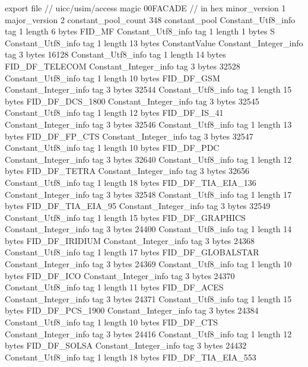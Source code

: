 export file {		// uicc/usim/access
	magic	00FACADE		 // in hex
	minor_version	1
	major_version	2
	constant_pool_count	348
	constant_pool {
		Constant_Utf8_info {
			tag	1
			length	6
			bytes	FID_MF
		}
		Constant_Utf8_info {
			tag	1
			length	1
			bytes	S
		}
		Constant_Utf8_info {
			tag	1
			length	13
			bytes	ConstantValue
		}
		Constant_Integer_info {
			tag	3
			bytes	16128
		}
		Constant_Utf8_info {
			tag	1
			length	14
			bytes	FID_DF_TELECOM
		}
		Constant_Integer_info {
			tag	3
			bytes	32528
		}
		Constant_Utf8_info {
			tag	1
			length	10
			bytes	FID_DF_GSM
		}
		Constant_Integer_info {
			tag	3
			bytes	32544
		}
		Constant_Utf8_info {
			tag	1
			length	15
			bytes	FID_DF_DCS_1800
		}
		Constant_Integer_info {
			tag	3
			bytes	32545
		}
		Constant_Utf8_info {
			tag	1
			length	12
			bytes	FID_DF_IS_41
		}
		Constant_Integer_info {
			tag	3
			bytes	32546
		}
		Constant_Utf8_info {
			tag	1
			length	13
			bytes	FID_DF_FP_CTS
		}
		Constant_Integer_info {
			tag	3
			bytes	32547
		}
		Constant_Utf8_info {
			tag	1
			length	10
			bytes	FID_DF_PDC
		}
		Constant_Integer_info {
			tag	3
			bytes	32640
		}
		Constant_Utf8_info {
			tag	1
			length	12
			bytes	FID_DF_TETRA
		}
		Constant_Integer_info {
			tag	3
			bytes	32656
		}
		Constant_Utf8_info {
			tag	1
			length	18
			bytes	FID_DF_TIA_EIA_136
		}
		Constant_Integer_info {
			tag	3
			bytes	32548
		}
		Constant_Utf8_info {
			tag	1
			length	17
			bytes	FID_DF_TIA_EIA_95
		}
		Constant_Integer_info {
			tag	3
			bytes	32549
		}
		Constant_Utf8_info {
			tag	1
			length	15
			bytes	FID_DF_GRAPHICS
		}
		Constant_Integer_info {
			tag	3
			bytes	24400
		}
		Constant_Utf8_info {
			tag	1
			length	14
			bytes	FID_DF_IRIDIUM
		}
		Constant_Integer_info {
			tag	3
			bytes	24368
		}
		Constant_Utf8_info {
			tag	1
			length	17
			bytes	FID_DF_GLOBALSTAR
		}
		Constant_Integer_info {
			tag	3
			bytes	24369
		}
		Constant_Utf8_info {
			tag	1
			length	10
			bytes	FID_DF_ICO
		}
		Constant_Integer_info {
			tag	3
			bytes	24370
		}
		Constant_Utf8_info {
			tag	1
			length	11
			bytes	FID_DF_ACES
		}
		Constant_Integer_info {
			tag	3
			bytes	24371
		}
		Constant_Utf8_info {
			tag	1
			length	15
			bytes	FID_DF_PCS_1900
		}
		Constant_Integer_info {
			tag	3
			bytes	24384
		}
		Constant_Utf8_info {
			tag	1
			length	10
			bytes	FID_DF_CTS
		}
		Constant_Integer_info {
			tag	3
			bytes	24416
		}
		Constant_Utf8_info {
			tag	1
			length	12
			bytes	FID_DF_SOLSA
		}
		Constant_Integer_info {
			tag	3
			bytes	24432
		}
		Constant_Utf8_info {
			tag	1
			length	18
			bytes	FID_DF_TIA_EIA_553
}}}
